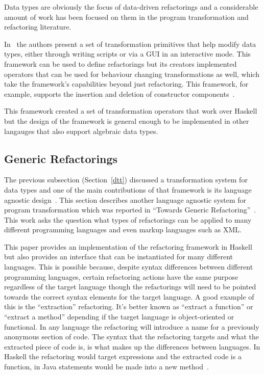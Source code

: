 Data types are obviously the focus of data-driven refactorings and a considerable amount of work has been focused on them in the program transformation and refactoring literature. 

In~\cite{dataTypeFramework} the authors present a set of transformation primitives that help modify data types, either through writing scripts or via a GUI in an interactive mode. This framework can be used to define refactorings but its creators implemented operators that can be used for behaviour changing transformations as well, which take the framework's capabilities beyond just refactoring. This framework, for example, supports the insertion and deletion of constructor components~\citep{dataTypeFramework}. 

This framework created a set of transformation operators that work over Haskell but the design of the framework is general enough to be implemented in other langauges that also support algebraic data types.

\subsection{Generic Refactorings}

The previous subsection (Section~\ref{dtt}) discussed a transformation system for data types and one of the main contributions of that framework is its language agnostic design~\citep{datatypeTransformation}. This section describes another language agnostic system for program transformation which was reported in ``Towards Generic Refactoring''~\citep{genericRefactoring}. This work asks the question what types of refactorings can be applied to many different programming languages and even markup languages such as XML. 

This paper provides an implementation of the refactoring framework in Haskell but also provides an interface that can be instantiated for many different languages. This is possible because, despite syntax differences between different programming languages, certain refactoring actions have the same purpose regardless of the target language though the refactorings will need to be pointed towards the correct syntax elements for the target language. A good example of this is the ``extraction'' refactoring. It's better known as ``extract a function'' or ``extract a method'' depending if the target language is object-oriented or functional. In any language the refactoring will introduce a name for a previously anonymous section of code. The syntax that the refactoring targets and what the extracted piece of code is, is what makes up the differences between languages. In Haskell the refactoring would target expressions and the extracted code is a function, in Java statements would be made into a new method~\citep{genericRefactoring}. 

